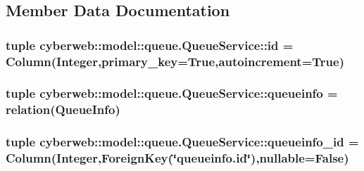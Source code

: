 \subsection{\-Member \-Data \-Documentation}
\hypertarget{classcyberweb_1_1model_1_1queue_1_1_queue_service_ac050144cc8cf04dbb6470b349539fe98}{
\subsubsection[{id}]{\setlength{\rightskip}{0pt plus 5cm}tuple {\bf cyberweb\-::model\-::queue.\-Queue\-Service\-::id} = \-Column(\-Integer,primary\-\_\-key=\-True,autoincrement=\-True)}}\label{classcyberweb_1_1model_1_1queue_1_1_queue_service_ac050144cc8cf04dbb6470b349539fe98}
\hypertarget{classcyberweb_1_1model_1_1queue_1_1_queue_service_aff34299eb8ecfc33955249be5805c3e5}{
\subsubsection[{queueinfo}]{\setlength{\rightskip}{0pt plus 5cm}tuple {\bf cyberweb\-::model\-::queue.\-Queue\-Service\-::queueinfo} = relation({\bf \-Queue\-Info})}}\label{classcyberweb_1_1model_1_1queue_1_1_queue_service_aff34299eb8ecfc33955249be5805c3e5}
\hypertarget{classcyberweb_1_1model_1_1queue_1_1_queue_service_af2a014d03512574ee27077fe122cbbbb}{
\subsubsection[{queueinfo\-\_\-id}]{\setlength{\rightskip}{0pt plus 5cm}tuple {\bf cyberweb\-::model\-::queue.\-Queue\-Service\-::queueinfo\-\_\-id} = \-Column(\-Integer,\-Foreign\-Key(\char`\"{}queueinfo.\-id\char`\"{}),nullable=\-False)}}\label{classcyberweb_1_1model_1_1queue_1_1_queue_service_af2a014d03512574ee27077fe122cbbbb}

